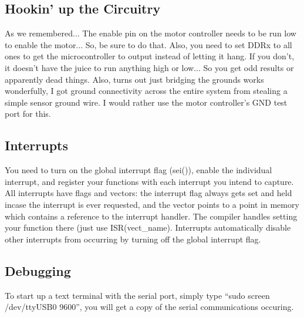 \documentclass{article}
\begin{document}
\subsection*{Hookin' up the Circuitry}
As we remembered... The enable pin on the motor controller needs to be run low to enable the motor... So, be sure to do that. Also, you need to set DDRx to all ones to get the microcontroller to output instead of letting it hang. If you don't, it doesn't have the juice to run anything high or low... So you get odd results or apparently dead things. Also, turns out just bridging the grounds works wonderfully, I got ground connectivity across the entire system from stealing a simple sensor ground wire. I would rather use the motor controller's GND test port for this.

\subsection*{Interrupts}
You need to turn on the global interrupt flag (sei()), enable the individual interrupt, and register your functions with each interrupt you intend to capture. All interrupts have flags and vectors: the interrupt flag always gets set and held incase the interrupt is ever requested, and the vector points to a point in memory which contains a reference to the interrupt handler. The compiler handles setting your function there (just use ISR(vect\_name).
Interrupts automatically disable other interrupts from occurring by turning off the global interrupt flag.

\subsection*{Debugging}
To start up a text terminal with the serial port, simply type ``sudo screen /dev/ttyUSB0 9600'', you will get a copy of the serial communications occuring.
\end{document}
